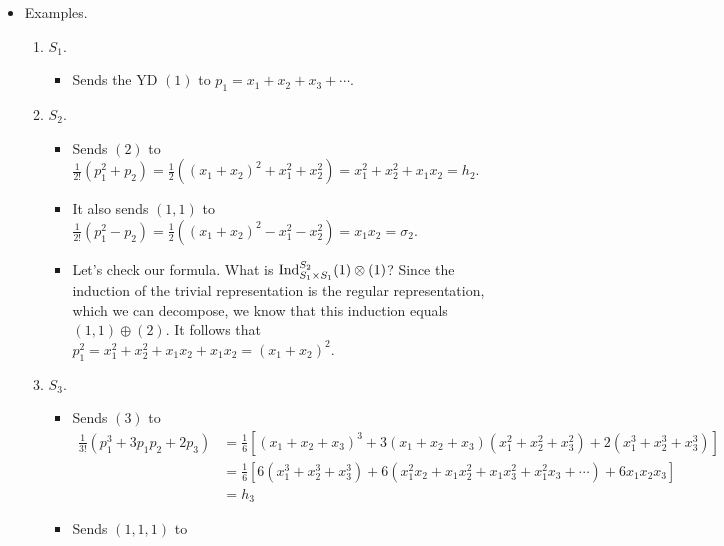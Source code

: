 \documentclass[../notes.tex]{subfiles}
\begin{document}
\begin{itemize}
\begin{proof}
        Now we write down the formula:
        \begin{equation*}
            \ch(\chi) = \frac{1}{n!}\sum_{\sigma\in S_n}\chi(\sigma)p_1^{\lambda_1(\sigma)}\cdots p_k^{\lambda_k(\sigma)}
        \end{equation*}
        where $\lambda_1(\sigma),\lambda_2(\sigma),\dots$ represent the cycle structure of $\sigma$; each $\lambda_i$ is a number of cycles of length $1,2,\dots$.
    \end{proof}
    \item Examples.
    \begin{enumerate}
        \item $S_1$.
        \begin{itemize}
            \item Sends the YD $(1)$ to $p_1=x_1+x_2+x_3+\cdots$.
        \end{itemize}
        \item $S_2$.
        \begin{itemize}
            \item Sends $(2)$ to $\frac{1}{2!}(p_1^2+p_2)=\frac{1}{2}((x_1+x_2)^2+x_1^2+x_2^2)=x_1^2+x_2^2+x_1x_2=h_2$.
            \item It also sends $(1,1)$ to $\frac{1}{2!}(p_1^2-p_2)=\frac{1}{2}((x_1+x_2)^2-x_1^2-x_2^2)=x_1x_2=\sigma_2$.
            \item Let's check our formula. What is $\operatorname{Ind}_{S_1\times S_1}^{S_2}(1)\otimes(1)$? Since the induction of the trivial representation is the regular representation, which we can decompose, we know that this induction equals $(1,1)\oplus(2)$. It follows that $p_1^2=x_1^2+x_2^2+x_1x_2+x_1x_2=(x_1+x_2)^2$.
        \end{itemize}
        \item $S_3$.
        \begin{itemize}
            \item Sends $(3)$ to
            \begin{align*}
                \frac{1}{3!}(p_1^3+3p_1p_2+2p_3) &= \frac{1}{6}[(x_1+x_2+x_3)^3+3(x_1+x_2+x_3)(x_1^2+x_2^2+x_3^2)+2(x_1^3+x_2^3+x_3^3)]\\
                &= \frac{1}{6}[6(x_1^3+x_2^3+x_3^3)+6(x_1^2x_2+x_1x_2^2+x_1x_3^2+x_1^2x_3+\cdots)+6x_1x_2x_3]\\
                &= h_3
            \end{align*}
            \item Sends $(1,1,1)$ to
            \begin{align*}

\end{align*}
\end{itemize}
\end{enumerate}
\end{itemize}
\end{document}
